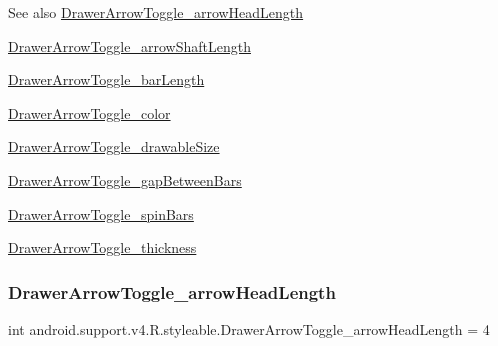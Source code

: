 \begin{DoxySeeAlso}{See also}
\hyperlink{classandroid_1_1support_1_1v4_1_1R_1_1styleable_a23a9c7acda0be283d52e3f0e07fb0a97}{Drawer\+Arrow\+Toggle\+\_\+arrow\+Head\+Length} 

\hyperlink{classandroid_1_1support_1_1v4_1_1R_1_1styleable_ab53d0e29cd65acb145c6d9782b331b94}{Drawer\+Arrow\+Toggle\+\_\+arrow\+Shaft\+Length} 

\hyperlink{classandroid_1_1support_1_1v4_1_1R_1_1styleable_a4f8d98b05b91ea2e7981c8af25395159}{Drawer\+Arrow\+Toggle\+\_\+bar\+Length} 

\hyperlink{classandroid_1_1support_1_1v4_1_1R_1_1styleable_ace7c2b30ab349131726e0b7a4ea67103}{Drawer\+Arrow\+Toggle\+\_\+color} 

\hyperlink{classandroid_1_1support_1_1v4_1_1R_1_1styleable_a4c53abe96194151c3a62076cc72f6048}{Drawer\+Arrow\+Toggle\+\_\+drawable\+Size} 

\hyperlink{classandroid_1_1support_1_1v4_1_1R_1_1styleable_ae17bd4d67410b191b674e1359e019598}{Drawer\+Arrow\+Toggle\+\_\+gap\+Between\+Bars} 

\hyperlink{classandroid_1_1support_1_1v4_1_1R_1_1styleable_a59eac02900e4f8c75b5cef8e7f80ef10}{Drawer\+Arrow\+Toggle\+\_\+spin\+Bars} 

\hyperlink{classandroid_1_1support_1_1v4_1_1R_1_1styleable_a1be933a91500d201cebc19118e4160bf}{Drawer\+Arrow\+Toggle\+\_\+thickness} 
\end{DoxySeeAlso}
\mbox{\label{classandroid_1_1support_1_1v4_1_1R_1_1styleable_a23a9c7acda0be283d52e3f0e07fb0a97}} 
\subsubsection{\texorpdfstring{Drawer\+Arrow\+Toggle\+\_\+arrow\+Head\+Length}{DrawerArrowToggle\_arrowHeadLength}}
{\footnotesize\ttfamily int android.\+support.\+v4.\+R.\+styleable.\+Drawer\+Arrow\+Toggle\+\_\+arrow\+Head\+Length = 4\hspace{0.3cm}{\ttfamily [static]}}

